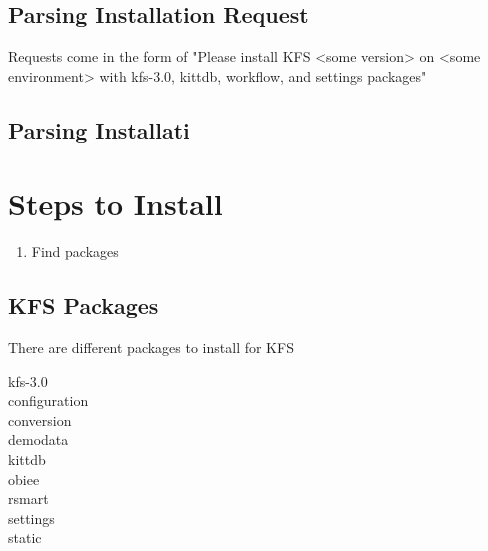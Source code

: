 \documentclass[12pt,notitlepage]{article}
\author{Leo Przybylski}
\begin{document}
  \W \begin{s5presentation}
  \maketitle

  \W \begin{s5slide}
\W \section{Parsing Installation Request}
Requests come in the form of "Please install KFS <some version> on <some environment> with kfs-3.0,
kittdb, workflow, and settings packages"
\W \end{s5slide}

  \W \begin{s5slide}
\W \section{Parsing Installati}
\W \end{s5slide}

\section{Steps to Install}
\begin{enumerate}
  \item Find packages
\end{enumerate}

  \W \begin{s5slide}
\section{KFS Packages}
There are different packages to install for KFS
\begin{description}
\item[kfs-3.0]
\item[configuration]
\item[conversion]
\item[demodata]
\item[kittdb]
\item[obiee]
\item[rsmart]
\item[settings]
\item[static]
\end{description}
\W \end{s5slide}

  \W \end{s5presentation}
\end{document}
